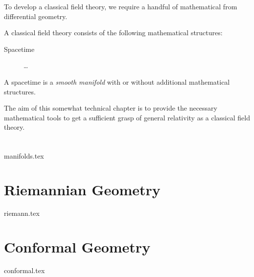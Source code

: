 








\phpar

To develop a classical field theory, we require a handful of mathematical  from differential geometry.

A classical field theory consists of the following mathematical structures:
\begin{description}
    \item[Spacetime] \dots
\end{description}

A spacetime is a \emph{smooth manifold} with or without additional mathematical structures.



The aim of this somewhat technical chapter is to provide the necessary mathematical tools to get a sufficient grasp of general relativity as a classical field theory.




\section{}
    {{manifolds.tex}}



\section{Riemannian Geometry}\label{sec:diffgeo:riemann}
    {{riemann.tex}}


\section{Conformal Geometry}\label{sec:diffgeo:conformal}
    {{conformal.tex}}